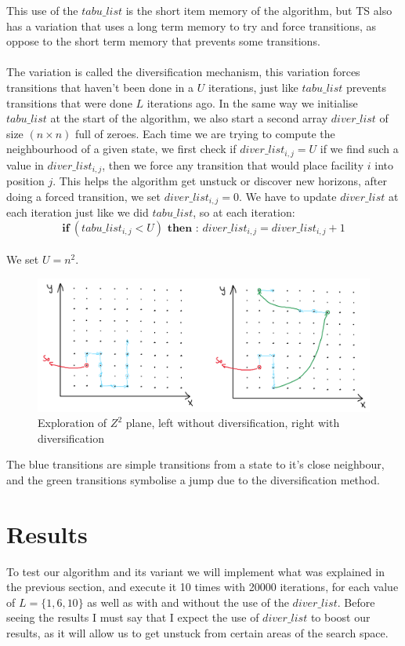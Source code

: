 \documentclass[a4paper]{article}
\begin{document}
This use of the $tabu\_list$ is the short item memory of the algorithm, but TS also has a variation that uses a long term memory to try and force transitions, as oppose to the short term memory that prevents some transitions.\\\\

The variation is called the diversification mechanism, this variation forces transitions that haven't been done in a $U$ iterations, just like $tabu\_list$ prevents transitions that were done $L$ iterations ago. In the same way we initialise $tabu\_list$ at the start of the algorithm, we also start a second array $diver\_list$ of size $(n \times n)$ full of zeroes. Each time we are trying to compute the neighbourhood of a given state, we first check if $diver\_list_{i,j} = U$ if we find such a value in $diver\_list_{i,j}$, then we force any transition that would place facility $i$ into position $j$. This helps the algorithm get unstuck or discover new horizons, after doing a forced transition, we set $diver\_list_{i,j} = 0$. We have to update $diver\_list$ at each iteration just like we did $tabu\_list$, so at each iteration:
$$\textbf{if}\ (tabu\_list_{i,j} < U) \textbf{ then : } diver\_list_{i,j} = diver\_list_{i,j} + 1 $$\\
We set $U = n^{2}$.
\begin{figure}[H]
\center
\includegraphics[width=1\textwidth]{images/with_without.PNG}
\caption{Exploration of $Z^{2}$ plane, left without diversification, right with diversification}
\end{figure}

The blue transitions are simple transitions from a state to it's close neighbour, and the green transitions symbolise a jump due to the diversification method.
\section{Results}

To test our algorithm and its variant we will implement what was explained in the previous section, and execute it 10 times with 20000 iterations, for each value of $L = \{1,6,10\}$ as well as with and without the use of the $diver\_list$. Before seeing the results I must say that I expect the use of $diver\_list$ to boost our results, as it will allow us to get unstuck from certain areas of the search space.
\end{document}
